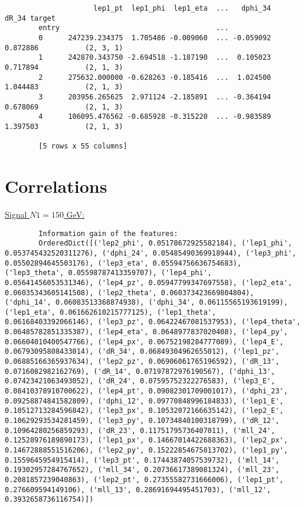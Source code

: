 \documentclass[a4paper, american, 12pt]{report}
\begin{document}
\begin{lstlisting}
					 lep1_pt  lep1_phi  lep1_eta  ...   dphi_34     dR_34 target
		entry                                     ...
		0      247239.234375  1.705486 -0.009060  ... -0.059092  0.872886  			(2, 3, 1)
		1      242870.343750 -2.694518 -1.187190  ...  0.105023  0.717894  			(2, 1, 3)
		2      275632.000000 -0.628263 -0.185416  ...  1.024500  1.044483  			(2, 1, 3)
		3      203956.265625  2.971124 -2.185891  ... -0.364194  0.678069  			(2, 1, 3)
		4      106095.476562 -0.685928 -0.315220  ... -0.983589  1.397503  			(2, 1, 3)
		
		[5 rows x 55 columns]
	\end{lstlisting}

	
	\chapter{Correlations}
	\label{appendix:Correlations}
	\underline{Signal $N1=150$ GeV:}	
	\begin{lstlisting}
		Information gain of the features:
		OrderedDict([('lep2_phi', 0.05178672925582184), ('lep1_phi', 0.053745432520311276), ('dphi_24', 0.05485490369918944), ('lep3_phi', 0.05502894645503176), ('lep3_eta', 0.05594756636754683), ('lep3_theta', 0.05598787413359707), ('lep4_phi', 0.05641456053531346), ('lep4_pz', 0.05947799347697558), ('lep2_eta', 0.06035343605141508), ('lep2_theta', 0.060373423669804804), ('dphi_14', 0.06083513368874938), ('dphi_34', 0.06115565193619199), ('lep1_eta', 0.061662610215777125), ('lep1_theta', 0.06168403392066146), ('lep3_pz', 0.06422467081537953), ('lep4_theta', 0.06485782851335387), ('lep4_eta', 0.0648977837020408), ('lep4_py', 0.06604010400547766), ('lep4_px', 0.06752198284777089), ('lep4_E', 0.06793095808433014), ('dR_34', 0.06849304962655012), ('lep1_pz', 0.06885166365937634), ('lep2_pz', 0.06906061765196592), ('dR_13', 0.0716082982162769), ('dR_14', 0.07197872976190567), ('dphi_13', 0.07423421063493052), ('dR_24', 0.07595752322276583), ('lep3_E', 0.08410378910700622), ('lep4_pt', 0.09082301709001017), ('dphi_23', 0.09258874841582809), ('dphi_12', 0.09770848996184833), ('lep1_E', 0.10512713284596842), ('lep3_px', 0.10532072166635142), ('lep2_E', 0.10629293534281459), ('lep3_py', 0.10734840100318799), ('dR_12', 0.10964280256859293), ('dR_23', 0.11751795736407011), ('mll_24', 0.12528976189890173), ('lep1_px', 0.14667014422688363), ('lep2_px', 0.14672888551516206), ('lep2_py', 0.15222854675813702), ('lep1_py', 0.1559645954915414), ('lep3_pt', 0.17443874057539732), ('mll_14', 0.19302957284767652), ('mll_34', 0.20736617389081324), ('mll_23', 0.2081857239040863), ('lep2_pt', 0.27355582731666006), ('lep1_pt', 0.276609594149106), ('mll_13', 0.28691694495451703), ('mll_12', 0.3932658736116754)])
	\end{lstlisting}
	
\end{document}
